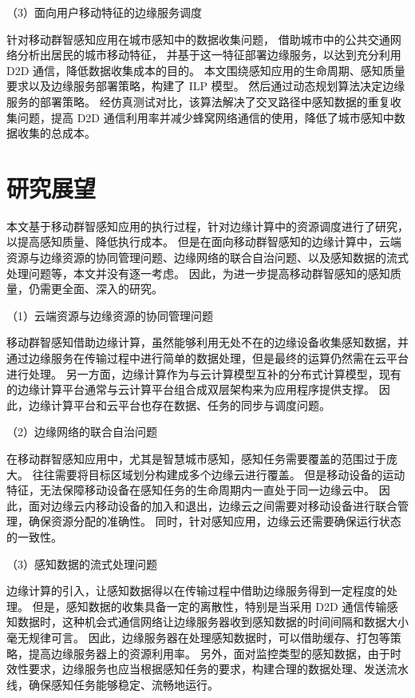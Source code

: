 （3）面向用户移动特征的边缘服务调度

针对移动群智感知应用在城市感知中的数据收集问题，
借助城市中的公共交通网络分析出居民的城市移动特征，
并基于这一特征部署边缘服务，以达到充分利用 D2D 通信，降低数据收集成本的目的。
本文围绕感知应用的生命周期、感知质量要求以及边缘服务部署策略，构建了 ILP 模型。
然后通过动态规划算法决定边缘服务的部署策略。
经仿真测试对比，该算法解决了交叉路径中感知数据的重复收集问题，提高 D2D 通信利用率并减少蜂窝网络通信的使用，降低了城市感知中数据收集的总成本。

\section{研究展望}

本文基于移动群智感知应用的执行过程，针对边缘计算中的资源调度进行了研究，以提高感知质量、降低执行成本。
但是在面向移动群智感知的边缘计算中，云端资源与边缘资源的协同管理问题、边缘网络的联合自治问题、以及感知数据的流式处理问题等，本文并没有逐一考虑。
因此，为进一步提高移动群智感知的感知质量，仍需更全面、深入的研究。

（1）云端资源与边缘资源的协同管理问题

移动群智感知借助边缘计算，虽然能够利用无处不在的边缘设备收集感知数据，并通过边缘服务在传输过程中进行简单的数据处理，但是最终的运算仍然需在云平台进行处理。
另一方面，边缘计算作为与云计算模型互补的分布式计算模型，现有的边缘计算平台通常与云计算平台组合成双层架构来为应用程序提供支撑。
因此，边缘计算平台和云平台也存在数据、任务的同步与调度问题。

（2）边缘网络的联合自治问题

在移动群智感知应用中，尤其是智慧城市感知，感知任务需要覆盖的范围过于庞大。
往往需要将目标区域划分构建成多个边缘云进行覆盖。
但是移动设备的运动特征，无法保障移动设备在感知任务的生命周期内一直处于同一边缘云中。
因此，面对边缘云内移动设备的加入和退出，边缘云之间需要对移动设备进行联合管理，确保资源分配的准确性。
同时，针对感知应用，边缘云还需要确保运行状态的一致性。

（3）感知数据的流式处理问题

边缘计算的引入，让感知数据得以在传输过程中借助边缘服务得到一定程度的处理。
但是，感知数据的收集具备一定的离散性，特别是当采用 D2D 通信传输感知数据时，这种机会式通信网络让边缘服务器收到感知数据的时间间隔和数据大小毫无规律可言。
因此，边缘服务器在处理感知数据时，可以借助缓存、打包等策略，提高边缘服务器上的资源利用率。
另外，面对监控类型的感知数据，由于时效性要求，边缘服务也应当根据感知任务的要求，构建合理的数据处理、发送流水线，确保感知任务能够稳定、流畅地运行。
